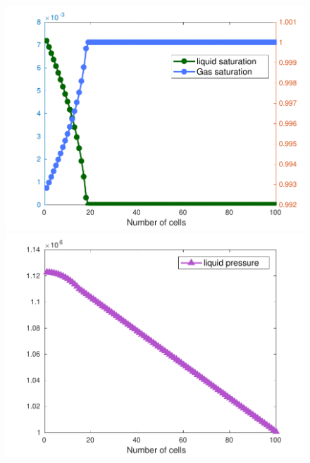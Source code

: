 \documentclass[10 pt]{beamer}
\begin{document}
\begin{frame}
\begin{figure}
\begin{minipage}[c]{.33\linewidth}
   \centering
\includegraphics[width=\textwidth]{image/image_saturation2_modif}    
\end{minipage}\hfill
\begin{minipage}[c]{.33\linewidth}
   \centering
\includegraphics[width=\textwidth]{image/image_liq_pressure_modif}    
\end{minipage}\hfill
\begin{minipage}[c]{.33\linewidth}
   \centering

\end{minipage}
\end{figure}
\end{frame}
\end{document}
